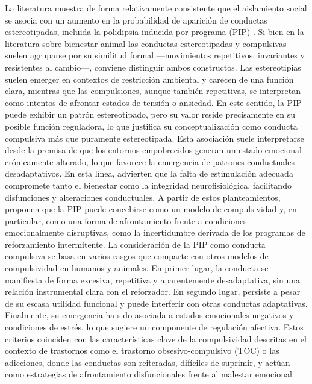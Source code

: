 \documentclass[12pt,a4paper]{article}
\begin{document}
\begin{multicols}{2}
La literatura muestra de forma relativamente consistente que el aislamiento social se asocia con un aumento en la probabilidad de aparición de conductas estereotipadas, incluida la polidipsia inducida por programa (PIP) \citep{Jones1989,ibias2016effects,wang2024social,GROSS201261}. Si bien en la literatura sobre bienestar animal las conductas estereotipadas y compulsivas suelen agruparse por su similitud formal —movimientos repetitivos, invariantes y resistentes al cambio—, conviene distinguir ambos constructos. Las estereotipias suelen emerger en contextos de restricción ambiental y carecen de una función clara, mientras que las compulsiones, aunque también repetitivas, se interpretan como intentos de afrontar estados de tensión o ansiedad. En este sentido, la PIP puede exhibir un patrón estereotipado, pero su valor reside precisamente en su posible función reguladora, lo que justifica su conceptualización como conducta compulsiva más que puramente estereotipada. Esta asociación suele interpretarse desde la premisa de que los entornos empobrecidos generan un estado emocional crónicamente alterado, lo que favorece la emergencia de patrones conductuales desadaptativos. En esta línea, \citet{GarciaRebollar2024} advierten que la falta de estimulación adecuada compromete tanto el bienestar como la integridad neurofisiológica, facilitando disfunciones y alteraciones conductuales. A partir de estos planteamientos, \citet{Moreno2012} proponen que la PIP puede concebirse como un modelo de compulsividad y, en particular, como una forma de afrontamiento frente a condiciones emocionalmente disruptivas, como la incertidumbre derivada de los programas de reforzamiento intermitente. La consideración de la PIP como conducta compulsiva se basa en varios rasgos que comparte con otros modelos de compulsividad en humanos y animales. En primer lugar, la conducta se manifiesta de forma excesiva, repetitiva y aparentemente desadaptativa, sin una relación instrumental clara con el reforzador. En segundo lugar, persiste a pesar de su escasa utilidad funcional y puede interferir con otras conductas adaptativas. Finalmente, su emergencia ha sido asociada a estados emocionales negativos y condiciones de estrés, lo que sugiere un componente de regulación afectiva. Estos criterios coinciden con las características clave de la compulsividad descritas en el contexto de trastornos como el trastorno obsesivo-compulsivo (TOC) o las adicciones, donde las conductas son reiteradas, difíciles de suprimir, y actúan como estrategias de afrontamiento disfuncionales frente al malestar emocional \citep{Fineberg2010}.


\end{multicols}
\end{document}
